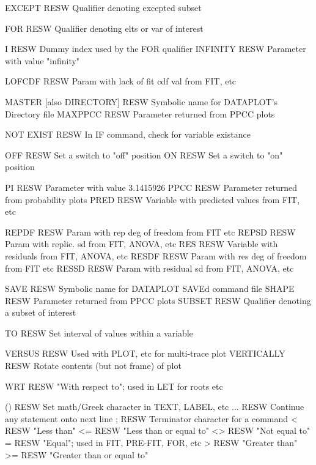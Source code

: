 EXCEPT                      RESW  Qualifier denoting excepted subset

FOR                         RESW  Qualifier denoting elts or var of interest

I                           RESW  Dummy index used by the FOR qualifier
INFINITY                    RESW  Parameter with value "infinity"

LOFCDF                      RESW  Param with lack of fit cdf val from FIT, etc

MASTER [also DIRECTORY]     RESW  Symbolic name for DATAPLOT's Directory file
MAXPPCC                     RESW  Parameter returned from PPCC plots

NOT EXIST                   RESW  In IF command, check for variable existance

OFF                         RESW  Set a switch to "off" position
ON                          RESW  Set a switch to "on" position

PI                          RESW  Parameter with value 3.1415926
PPCC                        RESW  Parameter returned from probability plots
PRED                        RESW  Variable with predicted values from FIT, etc

REPDF                       RESW  Param with rep deg of freedom from FIT etc
REPSD                       RESW  Param with replic. sd from FIT, ANOVA, etc
RES                         RESW  Variable with residuals from FIT, ANOVA, etc
RESDF                       RESW  Param with res deg of freedom from FIT etc
RESSD                       RESW  Param with residual sd from FIT, ANOVA, etc

SAVE                        RESW  Symbolic name for DATAPLOT SAVEd command file
SHAPE                       RESW  Parameter returned from PPCC plots
SUBSET                      RESW  Qualifier denoting a subset of interest

TO                          RESW  Set interval of values within a variable

VERSUS                      RESW  Used with PLOT, etc for multi-trace plot
VERTICALLY                  RESW  Rotate contents (but not frame) of plot

WRT                         RESW  "With respect to"; used in LET for roots etc

()                          RESW  Set math/Greek character in TEXT, LABEL, etc
...                         RESW  Continue any statement onto next line
;                           RESW  Terminator character for a command
<                           RESW  "Less than"
<=                          RESW  "Less than or equal to"
<>                          RESW  "Not equal to"
=                           RESW  "Equal"; used in FIT, PRE-FIT, FOR, etc
>                           RESW  "Greater than"
>=                          RESW  "Greater than or equal to"

